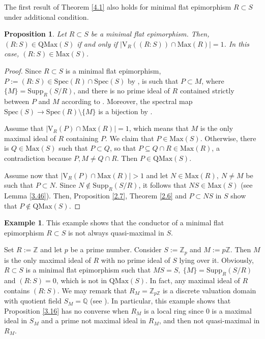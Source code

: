 \documentclass[12pt,leqno]{amsart}
\newtheorem{proposition}[theorem]{Proposition}
\theoremstyle{definition}
\newtheorem{example}[theorem]{Example}
\begin{document}
The first result of Theorem \ref{4.1} also holds for minimal flat epimorphism
 $R\subset S$ under additional condition.

\begin{proposition}\label{4.32} Let $R\subset S$ be a minimal flat epimorphism. Then, $(R:S)\in\mathrm{QMax}(S)$ if and only if $|\mathrm {V}_R ((R:S))\cap\mathrm{Max}(R)|=1$. In this case, $(R:S)\in\mathrm {Max} (S)$.
\end{proposition}
\begin{proof} Since $R\subset S$ is a minimal flat epimorphism, $P:=(R:S)\in\mathrm{Spec}(R)\cap\mathrm{Spec}(S)$ by \cite[Lemme 3.2]{FO}, is such that $P\subset M$, where $\{M\}=\mathrm{Supp}_R(S/R)$, and there is no prime ideal of $R$ contained strictly between $P$ and $M$ according to \cite[Corollary 9.3]{ARP}. Moreover, the spectral map $\mathrm{Spec}(S)\to\mathrm{Spec}(R)\setminus\{M\}$ is a bijection by \cite[Theorem 2.1]{DPP2}. 

Assume that $|\mathrm{V}_R(P)\cap\mathrm{Max}(R)|=1$, which means that $M$ is the only maximal ideal of $R$ containing $P$. We claim that $ P\in\mathrm{Max}(S)$. Otherwise, there is $Q\in\mathrm{Max}(S)$ such that $P\subset Q$, so that $P\subseteq Q\cap R\in\mathrm{Max}(R)$, a contradiction because $P,M\neq Q\cap R$. Then $P\in\mathrm{QMax}(S)$.

Assume now that $|\mathrm{V}_R(P)\cap\mathrm{Max}(R)|>1$ and let $N\in\mathrm{Max}(R),\ N\neq M$ be such that $P\subset N$. Since $N\not\in\mathrm{Supp}_R(S/R)$, it follows that $NS\in\mathrm{Max}(S)$ (see Lemma \ref{3.46}). Then, Proposition \ref{2.7}, Theorem \ref{2.6} and $P\subset NS$ in $S$ show that $P\not\in \mathrm{QMax}(S)$. 
\end{proof}

\begin{example}\label{4.33} This example shows that the conductor of a minimal flat epimorphism $R\subset S$ is not always quasi-maximal in $S$.

Set $R:=\mathbb Z$ and let $p$ be a prime number. Consider $S:=\mathbb Z_p$ and $M:=p\mathbb Z$. Then $M$ is the only maximal ideal of $R$ with no prime ideal of $S$ lying over it. Obviously, $R\subset S$ is a minimal flat epimorphism such that $MS=S,\ \{M\}=\mathrm{Supp}_R(S/R)$ and $(R:S)=0$, which is not in $\mathrm{QMax}(S)$. In fact, any maximal ideal of $R$ contains $(R:S)$. We may remark that $R_M=\mathbb Z_{p\mathbb Z}$ is a discrete valuation domain with quotient field $S_M=\mathbb Q$ (see \cite[Proposition 4.6]{DPPS}). In particular, this example shows that Proposition \ref{3.16} has no converse when $R_M$ is a local ring since $0$ is a maximal ideal in $S_M$ and a prime not maximal ideal in $R_M$, and then not quasi-maximal in $R_M$.
\end{example}
\end{document}
